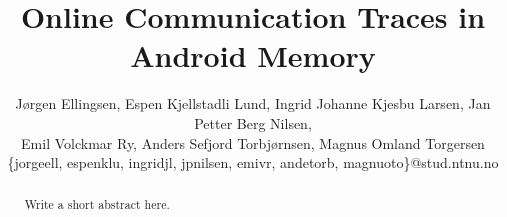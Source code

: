 \documentclass{sig-alternate-05-2015}
\begin{document}
\title{Online Communication Traces in Android Memory}

\author{
J{\o}rgen Ellingsen, Espen Kjellstadli Lund, Ingrid Johanne Kjesbu Larsen, Jan Petter Berg Nilsen,\\
Emil Volckmar Ry, Anders Sefjord Torbj{\o}rnsen, Magnus Omland Torgersen
\\\{jorgeell, espenklu, ingridjl, jpnilsen, emivr, andetorb, magnuoto\}@stud.ntnu.no
}

\maketitle
\begin{abstract}
Write a short abstract here.
\end{abstract}
















  
\end{document}
